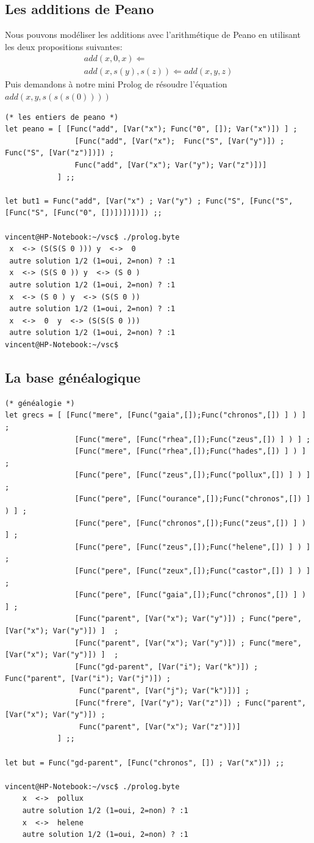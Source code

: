 \documentclass[11pt]{book}
\begin{document}
\subsection{Les additions de Peano}
Nous pouvons modéliser les additions avec l'arithmétique de Peano en utilisant les deux propositions suivantes:
$$
\begin{array}{l}
	add(x, 0, x) \Leftarrow \\
	add(x, s(y), s(z)) \Leftarrow  add(x,y,z)
\end{array}
$$
Puis demandons à notre mini Prolog de résoudre l'équation $add(x,y, s(s(s(0))))$
\begin{Verbatim}
(* les entiers de peano *)
let peano = [ [Func("add", [Var("x"); Func("0", []); Var("x")]) ] ;
				[Func("add", [Var("x");  Func("S", [Var("y")]) ; Func("S", [Var("z")])]) ;
				Func("add", [Var("x"); Var("y"); Var("z")])]
			] ;;

let but1 = Func("add", [Var("x") ; Var("y") ; Func("S", [Func("S", [Func("S", [Func("0", [])])])])]) ;; 

vincent@HP-Notebook:~/vsc$ ./prolog.byte 
 x  <-> (S(S(S 0 ))) y  <->  0 
 autre solution 1/2 (1=oui, 2=non) ? :1
 x  <-> (S(S 0 )) y  <-> (S 0 )
 autre solution 1/2 (1=oui, 2=non) ? :1
 x  <-> (S 0 ) y  <-> (S(S 0 ))
 autre solution 1/2 (1=oui, 2=non) ? :1
 x  <->  0  y  <-> (S(S(S 0 )))
 autre solution 1/2 (1=oui, 2=non) ? :1
vincent@HP-Notebook:~/vsc$ 
\end{Verbatim}
\subsection{La base généalogique}
\begin{Verbatim}
(* généalogie *)
let grecs = [ [Func("mere", [Func("gaia",[]);Func("chronos",[]) ] ) ] ;
				[Func("mere", [Func("rhea",[]);Func("zeus",[]) ] ) ] ;
				[Func("mere", [Func("rhea",[]);Func("hades",[]) ] ) ] ;
				[Func("pere", [Func("zeus",[]);Func("pollux",[]) ] ) ] ;
				[Func("pere", [Func("ourance",[]);Func("chronos",[]) ] ) ] ;
				[Func("pere", [Func("chronos",[]);Func("zeus",[]) ] ) ] ;
				[Func("pere", [Func("zeus",[]);Func("helene",[]) ] ) ] ;
				[Func("pere", [Func("zeux",[]);Func("castor",[]) ] ) ] ;
				[Func("pere", [Func("gaia",[]);Func("chronos",[]) ] ) ] ;
				[Func("parent", [Var("x"); Var("y")]) ; Func("pere", [Var("x"); Var("y")]) ]  ;
				[Func("parent", [Var("x"); Var("y")]) ; Func("mere", [Var("x"); Var("y")]) ]  ;
				[Func("gd-parent", [Var("i"); Var("k")]) ; Func("parent", [Var("i"); Var("j")]) ; 
				 Func("parent", [Var("j"); Var("k")])] ;
				[Func("frere", [Var("y"); Var("z")]) ; Func("parent", [Var("x"); Var("y")]) ; 
				 Func("parent", [Var("x"); Var("z")])]  							
			] ;;

let but = Func("gd-parent", [Func("chronos", []) ; Var("x")]) ;;
	
vincent@HP-Notebook:~/vsc$ ./prolog.byte 
	x  <->  pollux 
	autre solution 1/2 (1=oui, 2=non) ? :1
	x  <->  helene 
	autre solution 1/2 (1=oui, 2=non) ? :1
\end{Verbatim}
\end{document}
